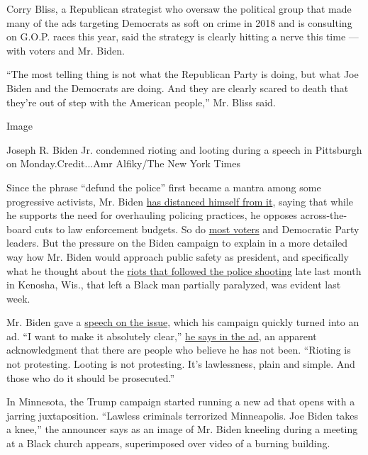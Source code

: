 Corry Bliss, a Republican strategist who oversaw the political group
that made many of the ads targeting Democrats as soft on crime in 2018
and is consulting on G.O.P. races this year, said the strategy is
clearly hitting a nerve this time --- with voters and Mr. Biden.

``The most telling thing is not what the Republican Party is doing, but
what Joe Biden and the Democrats are doing. And they are clearly scared
to death that they're out of step with the American people,'' Mr. Bliss
said.

Image

Joseph R. Biden Jr. condemned rioting and looting during a speech in
Pittsburgh on Monday.Credit...Amr Alfiky/The New York Times

Since the phrase ``defund the police'' first became a mantra among some
progressive activists, Mr. Biden
\href{https://www.nytimes3xbfgragh.onion/2020/06/08/us/politics/biden-defund-the-police.html}{has
distanced himself from it}, saying that while he supports the need for
overhauling policing practices, he opposes across-the-board cuts to law
enforcement budgets. So do
\href{https://www.nytimes3xbfgragh.onion/2020/06/26/us/politics/defund-police-protests-democrats.html}{most
voters} and Democratic Party leaders. But the pressure on the Biden
campaign to explain in a more detailed way how Mr. Biden would approach
public safety as president, and specifically what he thought about the
\href{https://www.nytimes3xbfgragh.onion/2020/08/24/us/kenosha-police-shooting.html}{riots
that followed the police shooting} late last month in Kenosha, Wis.,
that left a Black man partially paralyzed, was evident last week.

Mr. Biden gave a
\href{https://www.nytimes3xbfgragh.onion/2020/08/31/us/politics/biden-speech-trump.html}{speech
on the issue}, which his campaign quickly turned into an ad. ``I want to
make it absolutely clear,''
\href{https://www.youtube.com/watch?v=LgHXJ3rdOn0\&feature=youtu.be}{he
says in the ad}, an apparent acknowledgment that there are people who
believe he has not been. ``Rioting is not protesting. Looting is not
protesting. It's lawlessness, plain and simple. And those who do it
should be prosecuted.''

In Minnesota, the Trump campaign started running a new ad that opens
with a jarring juxtaposition. ``Lawless criminals terrorized
Minneapolis. Joe Biden takes a knee,'' the announcer says as an image of
Mr. Biden kneeling during a meeting at a Black church appears,
superimposed over video of a burning building.

